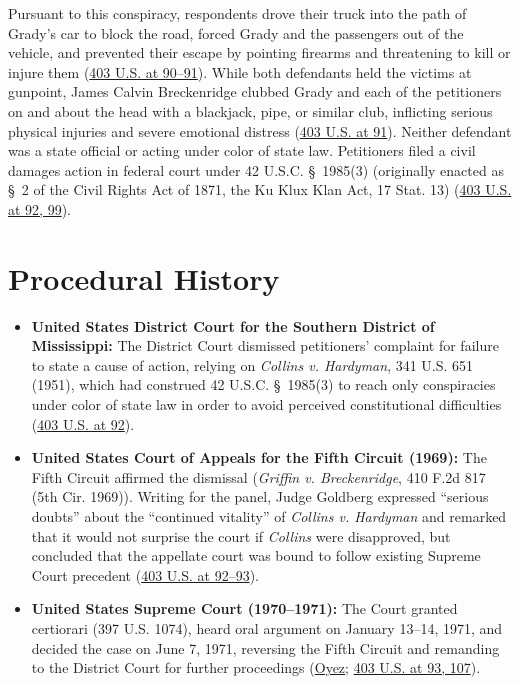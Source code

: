 \documentclass[12pt]{article}
\begin{document}
Pursuant to this conspiracy, respondents drove their truck into the path of Grady's car to block the road, forced Grady and the passengers out of the vehicle, and prevented their escape by pointing firearms and threatening to kill or injure them (\href{https://supreme.justia.com/cases/federal/us/403/88/}{403 U.S. at 90--91}). While both defendants held the victims at gunpoint, James Calvin Breckenridge clubbed Grady and each of the petitioners on and about the head with a blackjack, pipe, or similar club, inflicting serious physical injuries and severe emotional distress (\href{https://supreme.justia.com/cases/federal/us/403/88/}{403 U.S. at 91}). Neither defendant was a state official or acting under color of state law. Petitioners filed a civil damages action in federal court under 42 U.S.C. \S~1985(3) (originally enacted as \S~2 of the Civil Rights Act of 1871, the Ku Klux Klan Act, 17 Stat. 13) (\href{https://supreme.justia.com/cases/federal/us/403/88/}{403 U.S. at 92, 99}).

\section{Procedural History}

\begin{itemize}
\item \textbf{United States District Court for the Southern District of Mississippi:} The District Court dismissed petitioners' complaint for failure to state a cause of action, relying on \textit{Collins v. Hardyman}, 341 U.S. 651 (1951), which had construed 42 U.S.C. \S~1985(3) to reach only conspiracies under color of state law in order to avoid perceived constitutional difficulties (\href{https://supreme.justia.com/cases/federal/us/403/88/}{403 U.S. at 92}).
\item \textbf{United States Court of Appeals for the Fifth Circuit (1969):} The Fifth Circuit affirmed the dismissal (\textit{Griffin v. Breckenridge}, 410 F.2d 817 (5th Cir. 1969)). Writing for the panel, Judge Goldberg expressed ``serious doubts'' about the ``continued vitality'' of \textit{Collins v. Hardyman} and remarked that it would not surprise the court if \textit{Collins} were disapproved, but concluded that the appellate court was bound to follow existing Supreme Court precedent (\href{https://supreme.justia.com/cases/federal/us/403/88/}{403 U.S. at 92--93}).
\item \textbf{United States Supreme Court (1970--1971):} The Court granted certiorari (397 U.S. 1074), heard oral argument on January 13--14, 1971, and decided the case on June 7, 1971, reversing the Fifth Circuit and remanding to the District Court for further proceedings (\href{https://www.oyez.org/cases/1970/144}{Oyez}; \href{https://supreme.justia.com/cases/federal/us/403/88/}{403 U.S. at 93, 107}).
\end{itemize}
\end{document}
